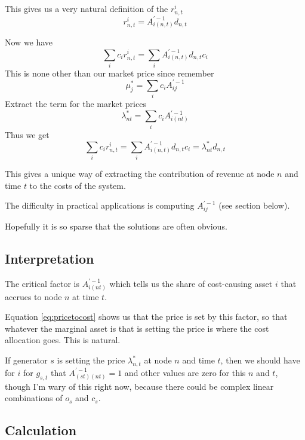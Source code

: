 \documentclass[final,3p,times]{elsarticle}
\begin{document}
This gives us a very natural definition of the $r^i_{n,t}$
\begin{equation}
  r^i_{n,t} = A^{\prime -1}_{i(n,t)} d_{n,t}
\end{equation}

Now we have
\begin{equation}
   \sum_i c_i r^i_{n,t} = \sum_i A^{\prime -1}_{i(n,t)} d_{n,t} c_i
\end{equation}
This is none other than our market price since remember
\begin{equation}
\mu_j^* = \sum_i c_i  A^{\prime -1}_{ij}
\end{equation}
Extract the term for the market prices
\begin{equation}
\lambda_{nt}^* = \sum_i c_i  A^{\prime -1}_{i(nt)} \label{eq:pricetocost}
\end{equation}
Thus we get
\begin{equation}
   \sum_i c_i r^i_{n,t} = \sum_i A^{\prime -1}_{i(n,t)} d_{n,t} c_i = \lambda_{nt}^* d_{n,t}
\end{equation}

This gives a unique way of extracting the contribution of revenue at node $n$ and time $t$ to the costs of the system.

The difficulty in practical applications is computing $A^{\prime -1}_{ij}$ (see section below).

Hopefully it is so sparse that the solutions are often obvious.

\subsection{Interpretation}

The critical factor is $A^{\prime -1}_{i(nt)}$ which tells us the share of cost-causing asset $i$ that accrues to node $n$ at time $t$.

Equation \eqref{eq:pricetocost} shows us that the price is set by this factor, so that whatever the marginal asset is that is setting the price is where the cost allocation goes. This is natural.

If generator $s$ is setting the price $\lambda^*_{n,t}$ at node $n$ and time $t$, then we should have for $i$ for $g_{s,t}$ that $A^{\prime -1}_{(st)(nt)} = 1$ and other values are zero for this $n$ and $t$, though I'm wary of this right now, because there could be complex linear combinations of $o_s$ and $c_s$.



\subsection{Calculation}
\end{document}
